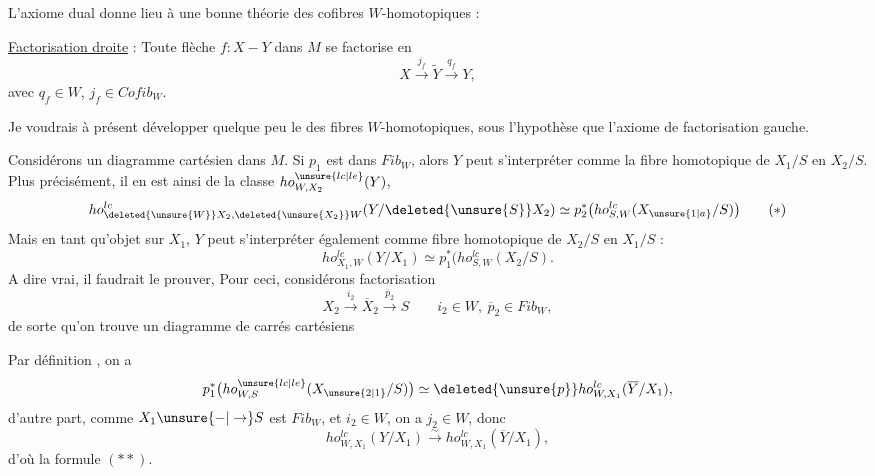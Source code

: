 L'axiome dual donne lieu à une bonne théorie des cofibres $W$-homotopiques :

\uline{Factorisation droite} : Toute flèche $f:X-Y$ dans $M$ se factorise en
\[
 X\xrightarrow{j_f}\widetilde Y\xrightarrow{q_f}Y,
\]
avec $q_f\in W$, $j_f\in Cofib_W$.



Je voudrais à présent développer quelque peu le  des fibres $W$-homotopiques, sous l'hypothèse  que  l'axiome de factorisation gauche.

Considérons un diagramme cartésien
dans $M$. Si $p_1$ est dans $Fib_W$, alors $Y$   peut s'interpréter comme la fibre homotopique de $X_1/S$ en $X_2/S$. Plus précisément, il en est ainsi de la classe $ho^{\unsure{lc|le}}_{W,X_2}(Y)$,
\[
 ho^{lc}_{\deleted{\unsure{W}}X_2,\deleted{\unsure{X_2}}W}
 (Y/\deleted{\unsure{S}}X_2)\simeq p_2^*\bigl(ho^{lc}_{S,W}(X_{\unsure{1|a}}/S)\bigr)
 \tag*{$(*)$}
\]
Mais en tant qu'objet sur $X_1$, $Y$ peut s'interpréter également comme fibre homotopique de $X_2/S$ en $X_1/S$ :
\[
 ho^{lc}_{X_1,W}(Y/X_1)\simeq p_1^*\bigl(ho^{lc}_{S,W}(X_2/S).
 \tag*{$(**)$}
\]
A dire vrai, il faudrait le prouver, Pour ceci, considérons  factorisation
\[
 X_2\xrightarrow{i_2}\overline X_2\xrightarrow{\overline p_2}S
 \qquad i_2\in W,\ \overline p_2\in Fib_W,
\]
de sorte qu'on trouve un diagramme de carrés cartésiens


Par définition  , on a
\[
 p_1^*\bigl(ho^{\unsure{lc|le}}_{W,S}(X_{\unsure{2|1}}/S)\bigr)
 \simeq \deleted{\unsure{p}}ho^{lc}_{W,X_1}(\overline Y/X_1),
\]
d'autre part, comme $X_1\unsure{-|\to}S$ est  $Fib_W$,  et $i_2\in W$, on a $j_2\in W$, donc
\[
 ho^{lc}_{W,X_1}(Y/X_1)\xrightarrow{\sim}ho^{lc}_{W,X_1}(\overline Y/X_1),
\]
d'où la formule $(**)$.

